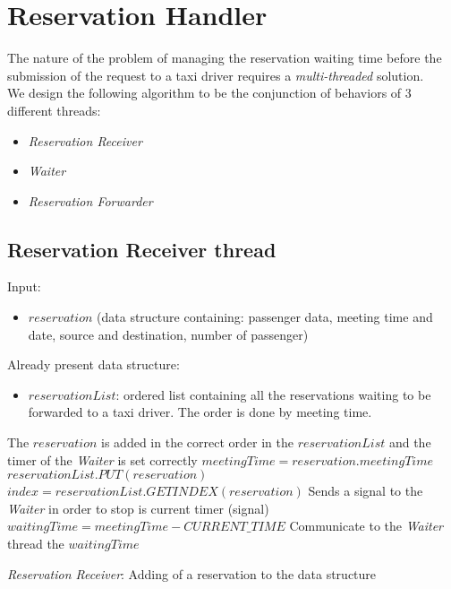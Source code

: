 

\section{Reservation Handler}\label{alg:reservationHandler}
The nature of the problem of managing the reservation waiting time before the submission of the request to a taxi driver requires a \textit{multi-threaded} solution.\\
We design the following algorithm to be the conjunction of behaviors of 3 different threads:
\begin{itemize}
	\item \textit{Reservation Receiver}
	\item \textit{Waiter}
	\item \textit{Reservation Forwarder}
\end{itemize}
\subsection{Reservation Receiver thread}
\begin{algorithm}[H]
\begin{algorithmic}
\REQUIRE Input: 
	\begin{itemize}
		\item $reservation$ (data structure containing: passenger data, meeting time and date, source and destination, number of passenger)
	\end{itemize}
Already present data structure:
\begin{itemize}
	\item $reservationList$: ordered list containing all the reservations waiting to be forwarded to a taxi driver. The order is done by meeting time.
\end{itemize}
\ENSURE The $reservation$ is added in the correct order in the $reservationList$ and the timer of the \textit{Waiter} is set correctly
\STATE $meetingTime = reservation.meetingTime$
\STATE $reservationList.PUT(reservation)$  
\STATE $index = reservationList.GETINDEX(reservation)$
	\STATE Sends a signal to the \textit{Waiter} in order to stop is current timer (signal)
	\STATE $waitingTime=meetingTime - CURRENT\_TIME$
	\STATE Communicate to the \textit{Waiter} thread the $waitingTime$
\ENDIF
\end{algorithmic}
\caption{\textit{Reservation Receiver}: Adding of a reservation to the data structure}
\end{algorithm}
